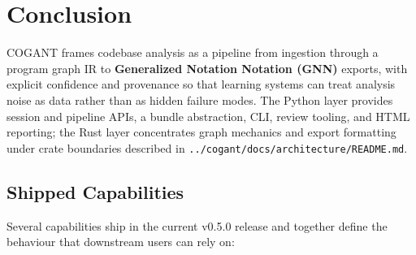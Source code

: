 \documentclass[
]{article}
\begin{document}
\newpage

\section{Conclusion}\label{conclusion}

COGANT frames codebase analysis as a pipeline from ingestion through a
program graph IR to \textbf{Generalized Notation Notation (GNN)}
exports, with explicit confidence and provenance so that learning
systems can treat analysis noise as data rather than as hidden failure
modes. The Python layer provides session and pipeline APIs, a bundle
abstraction, CLI, review tooling, and HTML reporting; the Rust layer
concentrates graph mechanics and export formatting under crate
boundaries described in \texttt{../cogant/docs/architecture/README.md}.

\subsection{Shipped Capabilities}\label{shipped-capabilities}

Several capabilities ship in the current v0.5.0 release and together
define the behaviour that downstream users can rely on:
\end{document}
